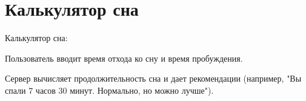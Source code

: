\chapter{Калькулятор сна}
\hypertarget{index}{}\label{index}
Калькулятор сна\+:
\begin{DoxyEnumerate}
\item Пользователь вводит время отхода ко сну и время пробуждения.
\item Сервер вычисляет продолжительность сна и дает рекомендации (например, "{}Вы спали 7 часов 30 минут. Нормально, но можно лучше"{}). 
\end{DoxyEnumerate}